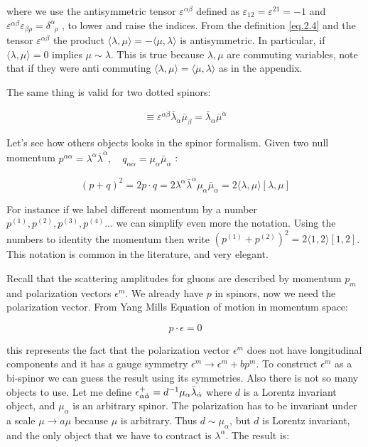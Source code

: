 where we use the antisymmetric tensor $\varepsilon^{\alpha \beta}$ defined as $\varepsilon_{12} = \varepsilon^{21} = -1 $ and $\varepsilon^{\alpha \beta} \varepsilon_{\beta\rho} = \delta^{\alpha}_{\;\;\rho}$ , to lower and raise the indices. From the definition \eqref{eq.2.4} and the tensor $\varepsilon^{\alpha \beta}$ the product $\langle \lambda ,\mu \rangle = -\langle \mu,\lambda  \rangle$ is antisymmetric. In particular, if  $\langle \lambda ,\mu \rangle = 0 $ implies $\mu \sim \lambda $.  This is true because $\lambda ,\mu$ are commuting variables, note that if they were anti commuting  $\langle \lambda ,\mu \rangle = \langle \mu,\lambda  \rangle$ as in the appendix.


The same thing is valid for two dotted spinors:

\begin{equation}
[\lambda,\mu] \equiv \varepsilon^{\dot{\alpha} \dot{\beta}} \bar{\lambda}_{\dot{\alpha}} \bar{\mu}_{\dot{\beta}} =\bar{\lambda}_{\dot{\alpha}} \bar{\mu}^{\dot{\alpha}}
\end{equation}


Let's see how others objects looks in the spinor formalism. Given two null momentum $p^{\dot{\alpha} \alpha } = \lambda^{\alpha}\bar{\lambda}^{\dot{\alpha}}, \quad q_{\alpha\dot{\alpha}}=\mu_{\alpha}\bar{\mu}_{\dot{\alpha}}$ :

\begin{equation}
(p + q)^{2} = 2p\cdot q = 2\lambda^{\alpha}\bar{\lambda}^{\dot{\alpha}} \mu_{\alpha}\bar{\mu}_{\dot{\alpha}} =2\langle \lambda,\mu  \rangle [\lambda,\mu]
\end{equation}

For instance if we label different momentum by a number $p^{(1)},p^{(2)},p^{(3)},p^{(4)}...$ we can simplify even more the notation. Using the numbers to identity the momentum then write $(p^{(1)} + p^{(2)})^{2}=2 \langle 1,2 \rangle [1,2]$. This notation is common in the literature, and very elegant.

Recall that the scattering amplitudes for gluons are described by momentum $p_{m}$ and  polarization vectors $\epsilon^{m}$. We already have $p$ in spinors, now we need the polarization vector. From Yang Mills Equation of motion in momentum space:

\begin{equation}
p \cdot \epsilon = 0 
\end{equation}  

this represents the fact that the polarization vector  $\epsilon^{m}$ does not have longitudinal components and it has a gauge symmetry $\epsilon^{m} \rightarrow \epsilon^{m} + bp^{m} $. To construct  $\epsilon^{m}$ as a bi-spinor we can guess the result using its symmetries. Also there is not so many objects to use. Let me define $\epsilon^{+}_{\alpha \dot{\alpha}} = d^{-1} \mu_{\alpha} \bar{\lambda}_{\dot{\alpha}}$ where $d$ is a Lorentz invariant object, and $\mu_{\alpha}$ is an arbitrary spinor. The polarization has to be invariant under a scale  $\mu \rightarrow a\mu$ because $\mu$ is arbitrary. Thus $d \sim \mu_{\alpha}$, but $d$ is Lorentz invariant, and the only object that we have to contract is $\lambda^{\alpha}$. The result is: 

